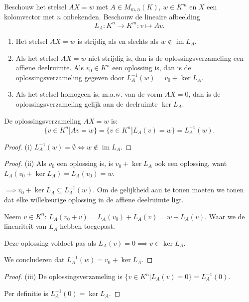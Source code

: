 \begin{lemma}[5.3.1]
    Beschouw het stelsel $AX = w$ met $A \in M_{m,n}(K)$, $w \in K^m$ en $X$ een kolomvector met $n$ onbekenden. Beschouw de lineaire afbeelding
    \[ L_A \colon K^n \to K^m \colon v \mapsto Av. \]
    \begin{enumerate}
        \item[(i)] Het stelsel $AX = w$ is strijdig als en slechts als $w \notin \operatorname{im} L_A$.
        \item[(ii)] Als het stelsel $AX = w$ niet strijdig is, dan is de oplossingsverzameling een affiene deelruimte. Als $v_0 \in K^n$ een oplossing is, dan is de oplossingsverzameling gegeven door $L_A^{-1}(w) = v_0 + \operatorname{ker} L_A$.
        \item[(iii)] Als het stelsel homogeen is, m.a.w. van de vorm $AX = 0$, dan is de oplossingsverzameling gelijk aan de deelruimte $\operatorname{ker} L_A$.
    \end{enumerate}
\end{lemma}
De oplossingsverzameling \(AX = w\) is:
\[
\{v\in K^n | Av = w\} = \{v \in K^n | L_A(v) = w\} = L_A^{-1}(w).
\]
\begin{proof}(i)
    \(L_A^{-1}(w) = \emptyset \iff w \notin \operatorname{im} L_A\).
\end{proof}
\begin{proof}(ii)
    Als \(v_0\) een oplossing is, is \(v_0 + \ker L_A \) ook een oplossing, want \(L_A (v_0 + \ker L_A) = L_A(v_0) =  w\).
    
    \(\implies    v_0 + \ker L_A \subseteq L_A^{-1}(w) \).
    Om de gelijkheid aan te tonen moeten we tonen dat elke willekeurige oplossing in de affiene deelruimte ligt.

    Neem \(v \in K^n\):
    \(L_A (v_0 + v) = L_A (v_0)  + L_A ( v) = w + L_A (v)\). Waar we de lineariteit van \(L_A\) hebben toegepast.

    Deze oplossing voldoet pas als \(L_A (v) = 0 \implies v \in \ker L_A \).

    We concluderen dat \(L_A^{-1}(w) = v_0 + \operatorname{ker} L_A\).

\end{proof}
\begin{proof}(iii)
    De oplossingsverzameling is \(\{v \in K^n | L_A(v) = 0\} = L_A^{-1}(0)\).

    Per definitie is \(  L_A^{-1}(0) = \ker L_A\).
\end{proof}

